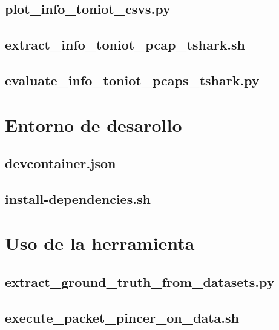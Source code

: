 \documentclass[11pt]{report}
\begin{document}
\section{plot\_info\_toniot\_csvs.py}


\section{extract\_info\_toniot\_pcap\_tshark.sh}


\section{evaluate\_info\_toniot\_pcaps\_tshark.py}


\chapter{Entorno de desarollo}
\section{devcontainer.json}


\section{install-dependencies.sh}


\chapter{Uso de la herramienta}
\section{extract\_ground\_truth\_from\_datasets.py}


\section{execute\_packet\_pincer\_on\_data.sh}

\end{document}
